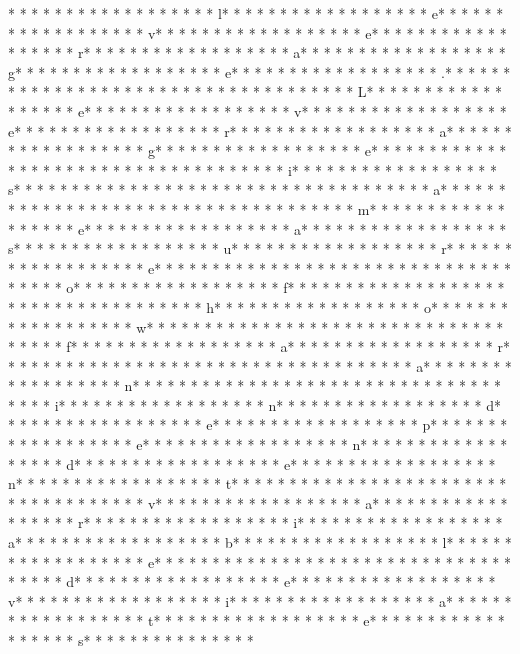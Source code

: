 * * *  * * *  * * *  *  * * *  *  * * *  * l* * *  * * *  * * *  *  * * *  *  * * *  * e* * *  * * *  * * *  *  * * *  *  * * *  * v* * *  * * *  * * *  *  * * *  *  * * *  * e* * *  * * *  * * *  *  * * *  *  * * *  * r* * *  * * *  * * *  *  * * *  *  * * *  * a* * *  * * *  * * *  *  * * *  *  * * *  * g* * *  * * *  * * *  *  * * *  *  * * *  * e* * *  * * *  * * *  *  * * *  *  * * *  * .* * *  * * *  * * *  *  * * *  *  * * *  *  * * *  * * *  * * *  *  * * *  *  * * *  * L* * *  * * *  * * *  *  * * *  *  * * *  * e* * *  * * *  * * *  *  * * *  *  * * *  * v* * *  * * *  * * *  *  * * *  *  * * *  * e* * *  * * *  * * *  *  * * *  *  * * *  * r* * *  * * *  * * *  *  * * *  *  * * *  * a* * *  * * *  * * *  *  * * *  *  * * *  * g* * *  * * *  * * *  *  * * *  *  * * *  * e* * *  * * *  * * *  *  * * *  *  * * *  *  * * *  * * *  * * *  *  * * *  *  * * *  * i* * *  * * *  * * *  *  * * *  *  * * *  * s* * *  * * *  * * *  *  * * *  *  * * *  *  * * *  * * *  * * *  *  * * *  *  * * *  * a* * *  * * *  * * *  *  * * *  *  * * *  *  * * *  * * *  * * *  *  * * *  *  * * *  * m* * *  * * *  * * *  *  * * *  *  * * *  * e* * *  * * *  * * *  *  * * *  *  * * *  * a* * *  * * *  * * *  *  * * *  *  * * *  * s* * *  * * *  * * *  *  * * *  *  * * *  * u* * *  * * *  * * *  *  * * *  *  * * *  * r* * *  * * *  * * *  *  * * *  *  * * *  * e* * *  * * *  * * *  *  * * *  *  * * *  *  * * *  * * *  * * *  *  * * *  *  * * *  * o* * *  * * *  * * *  *  * * *  *  * * *  * f* * *  * * *  * * *  *  * * *  *  * * *  *  * * *  * * *  * * *  *  * * *  *  * * *  * h* * *  * * *  * * *  *  * * *  *  * * *  * o* * *  * * *  * * *  *  * * *  *  * * *  * w* * *  * * *  * * *  *  * * *  *  * * *  *  * * *  * * *  * * *  *  * * *  *  * * *  * f* * *  * * *  * * *  *  * * *  *  * * *  * a* * *  * * *  * * *  *  * * *  *  * * *  * r* * *  * * *  * * *  *  * * *  *  * * *  *  * * *  * * *  * * *  *  * * *  *  * * *  * a* * *  * * *  * * *  *  * * *  *  * * *  * n* * *  * * *  * * *  *  * * *  *  * * *  *  * * *  * * *  * * *  *  * * *  *  * * *  * i* * *  * * *  * * *  *  * * *  *  * * *  * n* * *  * * *  * * *  *  * * *  *  * * *  * d* * *  * * *  * * *  *  * * *  *  * * *  * e* * *  * * *  * * *  *  * * *  *  * * *  * p* * *  * * *  * * *  *  * * *  *  * * *  * e* * *  * * *  * * *  *  * * *  *  * * *  * n* * *  * * *  * * *  *  * * *  *  * * *  * d* * *  * * *  * * *  *  * * *  *  * * *  * e* * *  * * *  * * *  *  * * *  *  * * *  * n* * *  * * *  * * *  *  * * *  *  * * *  * t* * *  * * *  * * *  *  * * *  *  * * *  *  * * *  * * *  * * *  *  * * *  *  * * *  * v* * *  * * *  * * *  *  * * *  *  * * *  * a* * *  * * *  * * *  *  * * *  *  * * *  * r* * *  * * *  * * *  *  * * *  *  * * *  * i* * *  * * *  * * *  *  * * *  *  * * *  * a* * *  * * *  * * *  *  * * *  *  * * *  * b* * *  * * *  * * *  *  * * *  *  * * *  * l* * *  * * *  * * *  *  * * *  *  * * *  * e* * *  * * *  * * *  *  * * *  *  * * *  *  * * *  * * *  * * *  *  * * *  *  * * *  * d* * *  * * *  * * *  *  * * *  *  * * *  * e* * *  * * *  * * *  *  * * *  *  * * *  * v* * *  * * *  * * *  *  * * *  *  * * *  * i* * *  * * *  * * *  *  * * *  *  * * *  * a* * *  * * *  * * *  *  * * *  *  * * *  * t* * *  * * *  * * *  *  * * *  *  * * *  * e* * *  * * *  * * *  *  * * *  *  * * *  * s* * *  * * *  * * *  *  * * *  *  * 